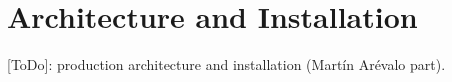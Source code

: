 \section{Architecture and Installation}
[ToDo]: production architecture and installation (Martín Arévalo part).
